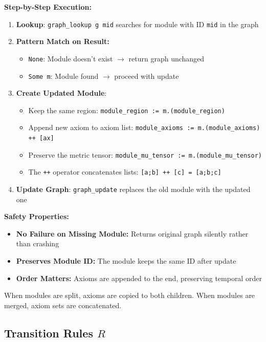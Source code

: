 \textbf{Step-by-Step Execution:}
\begin{enumerate}
    \item \textbf{Lookup}: \texttt{graph\_lookup g mid} searches for module with ID \texttt{mid} in the graph
    \item \textbf{Pattern Match on Result:}
    \begin{itemize}
        \item \texttt{None}: Module doesn't exist $\rightarrow$ return graph unchanged
        \item \texttt{Some m}: Module found $\rightarrow$ proceed with update
    \end{itemize}
    \item \textbf{Create Updated Module}: 
    \begin{itemize}
        \item Keep the same region: \texttt{module\_region := m.(module\_region)}
        \item Append new axiom to axiom list: \texttt{module\_axioms := m.(module\_axioms) ++ [ax]}
        \item Preserve the metric tensor: \texttt{module\_mu\_tensor := m.(module\_mu\_tensor)}
        \item The \texttt{++} operator concatenates lists: \texttt{[a;b] ++ [c] = [a;b;c]}
    \end{itemize}
    \item \textbf{Update Graph}: \texttt{graph\_update} replaces the old module with the updated one
\end{enumerate}

\textbf{Safety Properties:}
\begin{itemize}
    \item \textbf{No Failure on Missing Module:} Returns original graph silently rather than crashing
    \item \textbf{Preserves Module ID:} The module keeps the same ID after update
    \item \textbf{Order Matters:} Axioms are appended to the end, preserving temporal order
\end{itemize}

When modules are split, axioms are copied to both children. When modules are merged, axiom sets are concatenated.

\subsection{Transition Rules $R$}

